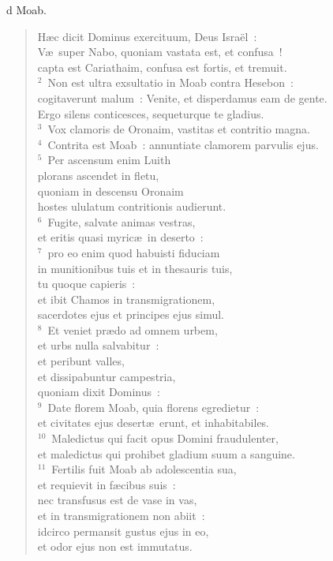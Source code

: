 \bchapter
{}d Moab. \begin{flushleft}\begin{verse}\vspace{6pt}H\ae c dicit Dominus exercituum, Deus Isra\"el~:\\ V\ae\ super Nabo, quoniam vastata est, et confusa~!\\ capta est Cariathaim, confusa est fortis, et tremuit.\\
${}^{2}$~Non est ultra exsultatio in Moab contra Hesebon~:\\ cogitaverunt malum~: Venite, et disperdamus eam de gente.\\ Ergo silens conticesces, sequeturque te gladius.\\
${}^{3}$~Vox clamoris de Oronaim, vastitas et contritio magna.\\
${}^{4}$~Contrita est Moab~: annuntiate clamorem parvulis ejus.\\
${}^{5}$~Per ascensum enim Luith\\ plorans ascendet in fletu,\\ quoniam in descensu Oronaim\\ hostes ululatum contritionis audierunt.\\
${}^{6}$~Fugite, salvate animas vestras,\\ et eritis quasi myric\ae\ in deserto~:\\
${}^{7}$~pro eo enim quod habuisti fiduciam\\ in munitionibus tuis et in thesauris tuis,\\ tu quoque capieris~:\\ et ibit Chamos in transmigrationem,\\ sacerdotes ejus et principes ejus simul.\\
${}^{8}$~Et veniet pr\ae do ad omnem urbem,\\ et urbs nulla salvabitur~:\\ et peribunt valles,\\ et dissipabuntur campestria,\\ quoniam dixit Dominus~:\\
${}^{9}$~Date florem Moab, quia florens egredietur~:\\ et civitates ejus desert\ae\ erunt, et inhabitabiles.\\
${}^{10}$~Maledictus qui facit opus Domini fraudulenter,\\ et maledictus qui prohibet gladium suum a sanguine.\\
${}^{11}$~Fertilis fuit Moab ab adolescentia sua,\\ et requievit in f\ae cibus suis~:\\ nec transfusus est de vase in vas,\\ et in transmigrationem non abiit~:\\ idcirco permansit gustus ejus in eo,\\ et odor ejus non est immutatus.\\

\end{verse}
\end{flushleft}
